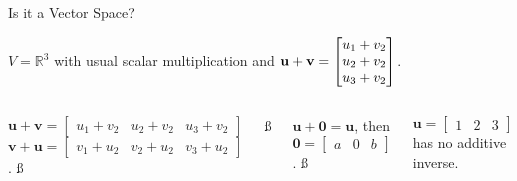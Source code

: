 \documentclass[xcolor=dvipsnames,aspectratio=169,t]{beamer}
\begin{document}
\begin{frame}{Is it a Vector Space?}
\bigskip

{\small $V = \mathbb{R}^3$ with usual scalar multiplication and
$\displaystyle \mathbf{u} + \mathbf{v} = \begin{bmatrix} u_1 + v_2 \\ u_2 + v_2 \\ u_3 + v_2 \end{bmatrix}$.}

\bigskip

\pause
\begin{columns}[T]

\column{0.5\tw}

\bb
\ii {} \ms

\ii \alert{$\mathbf{u} + \mathbf{v} = \begin{bmatrix} u_1 + v_2 & u_2 + v_2 & u_3 + v_2 \end{bmatrix}$\\
$\mathbf{v} + \mathbf{u} = \begin{bmatrix} v_1 + u_2 & v_2 + u_2 & v_3 + u_2 \end{bmatrix}$.} \ss

 \ss

\ii \alert{$\mathbf{u} + \mathbf{0} = \mathbf{u}$, then $\mathbf{0} = \begin{bmatrix} a & 0 & b \end{bmatrix}$.} \ss

\ii \alert{$\mathbf{u} = \begin{bmatrix} 1 & 2 & 3 \end{bmatrix}$ has no additive inverse.}
\ee

\column{0.5\tw}

\bb
\addtocounter{enumi}{5}
\ii {} \ms

 \ms


\end{columns}
\end{frame}
\end{document}
